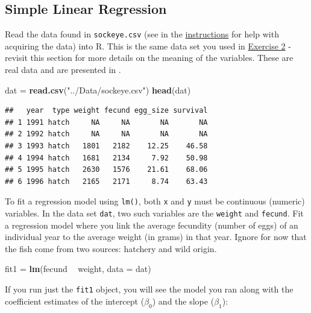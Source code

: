 \documentclass[]{book}
\newenvironment{Shaded}{\begin{snugshade}}{\end{snugshade}}
\newcommand{\KeywordTok}[1]{\textcolor[rgb]{0.13,0.29,0.53}{\textbf{#1}}}
\newcommand{\DataTypeTok}[1]{\textcolor[rgb]{0.13,0.29,0.53}{#1}}
\newcommand{\StringTok}[1]{\textcolor[rgb]{0.31,0.60,0.02}{#1}}
\newcommand{\OperatorTok}[1]{\textcolor[rgb]{0.81,0.36,0.00}{\textbf{#1}}}
\newcommand{\NormalTok}[1]{#1}
\theoremstyle{definition}
\theoremstyle{definition}
\theoremstyle{definition}
\theoremstyle{remark}
\begin{document}
\subsection{Simple Linear Regression}\label{regression}

Read the data found in \texttt{sockeye.csv} (see in the
\protect\hyperlink{data-sets}{instructions} for help with acquiring the
data) into R. This is the same data set you used in
\protect\hyperlink{ex2}{Exercise 2} - revisit this section for more
details on the meaning of the variables. These are real data and are
presented in \citet{sockeye-cite}.

\begin{Shaded}
\begin{Highlighting}[]
\NormalTok{dat =}\StringTok{ }\KeywordTok{read.csv}\NormalTok{(}\StringTok{"../Data/sockeye.csv"}\NormalTok{)}
\KeywordTok{head}\NormalTok{(dat)}
\end{Highlighting}
\end{Shaded}

\begin{verbatim}
##   year  type weight fecund egg_size survival
## 1 1991 hatch     NA     NA       NA       NA
## 2 1992 hatch     NA     NA       NA       NA
## 3 1993 hatch   1801   2182    12.25    46.58
## 4 1994 hatch   1681   2134     7.92    50.98
## 5 1995 hatch   2630   1576    21.61    68.06
## 6 1996 hatch   2165   2171     8.74    63.43
\end{verbatim}

To fit a regression model using \texttt{lm()}, both \texttt{x} and
\texttt{y} must be continuous (numeric) variables. In the data set
\texttt{dat}, two such variables are the \texttt{weight} and
\texttt{fecund}. Fit a regression model where you link the average
fecundity (number of eggs) of an individual year to the average weight
(in grams) in that year. Ignore for now that the fish come from two
sources: hatchery and wild origin.

\begin{Shaded}
\begin{Highlighting}[]
\NormalTok{fit1 =}\StringTok{ }\KeywordTok{lm}\NormalTok{(fecund }\OperatorTok{~}\StringTok{ }\NormalTok{weight, }\DataTypeTok{data =}\NormalTok{ dat)}
\end{Highlighting}
\end{Shaded}

If you run just the \texttt{fit1} object, you will see the model you ran
along with the coefficient estimates of the intercept (\(\beta_0\)) and
the slope (\(\beta_1\)):
\end{document}
